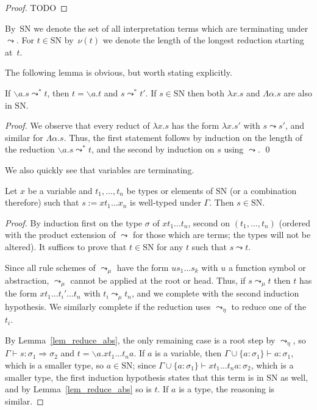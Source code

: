 \documentclass[runningheads,a4paper]{llncs}
\newcommand{\arrtype}{\Rightarrow}
\newcommand{\arreta}{\leadsto_\eta}
\newcommand{\arrnormalise}{\leadsto}
\newcommand{\normstep}{\leadsto_\mu}
\newcommand{\abs}[2]{\lambda #1.#2}
\newcommand{\tabs}[2]{\Lambda #1.#2}
\newcommand{\abstraction}[2]{\backslash #1.#2}
\newcommand{\SN}{\mathrm{SN}}
\newcommand{\proves}{\vdash}
\begin{document}
\begin{proof}
  TODO
\end{proof}

By~$\SN$ we denote the set of all interpretation terms which are
terminating under $\arrnormalise$. For $t \in \SN$ by~$\nu(t)$ we
denote the length of the longest reduction starting at~$t$.

The following lemma is obvious, but worth stating explicitly.

\begin{lemma}\label{lem_reduce_abs}
If $\abstraction{a}{s} \arrnormalise^* t$, then $t = \abstraction{a}{
t}$ and $s \arrnormalise^* t'$.
If $s \in \SN$ then both $\abs{x}{s}$ and $\tabs{\alpha}{s}$ are also
in $\SN$.
\end{lemma}

\begin{proof}
We observe that every reduct of $\abs{x}{s}$ has the form $\abs{x}{s'}$
with $s \arrnormalise s'$, and similar for $\tabs{\alpha}{s}$.
Thus, the first statement follows by induction on the length of the
reduction $\abstraction{a}{s} \arrnormalise^* t$, and the second by
induction on $s$ using $\arrnormalise$.
\qed
\end{proof}

We also quickly see that variables are terminating.

\begin{lemma}\label{lem_var_sn}
Let $x$ be a variable and $t_1,\dots,t_n$ be types or elements of $\SN$
(or a combination therefore) such that $s := x t_1 \ldots x_n$ is
well-typed under $\Gamma$.  Then $s \in \SN$.
\end{lemma}

\begin{proof}
By induction first on the type $\sigma$ of $x t_1 \ldots t_n$, second
on $(t_1,\dots,t_n)$ (ordered with the product extension of
$\arrnormalise$ for those which are terms; the types will not be
altered).  It suffices to prove that $t \in \SN$ for any $t$ such that
$s \arrnormalise t$.

Since all rule schemes of $\normstep$ have the form $u s_1 \ldots s_k$
with $u$ a function symbol or abstraction, $\normstep$ cannot be applied
at the root or head.  Thus, if $s \normstep t$ then $t$ has the form $x
t_1 \ldots t_i' \ldots t_n$ with $t_i \normstep t_n$, and we complete
with the second induction hypothesis.  We similarly complete if the
reduction uses $\arreta$ to reduce one of the $t_i$.

By Lemma~\ref{lem_reduce_abs}, the only remaining case is a root step by
$\arreta$, so $\Gamma \proves s : \sigma_1 \arrtype \sigma_2$ and
$t = \abstraction{a}{x t_1 \ldots t_n a}$.
If $a$ is a variable, then $\Gamma \cup \{a : \sigma_1\} \proves a :
\sigma_1$, which is a smaller type, so $a \in \SN$; since $\Gamma \cup
\{a : \sigma_1\} \proves x t_1 \ldots t_n a : \sigma_2$, which is a
smaller type, the first induction hypothesis states that this term is
in $\SN$ as well, and by Lemma~\ref{lem_reduce_abs} so is $t$.
If $a$ is a type, the reasoning is similar.
\end{proof}
\end{document}
